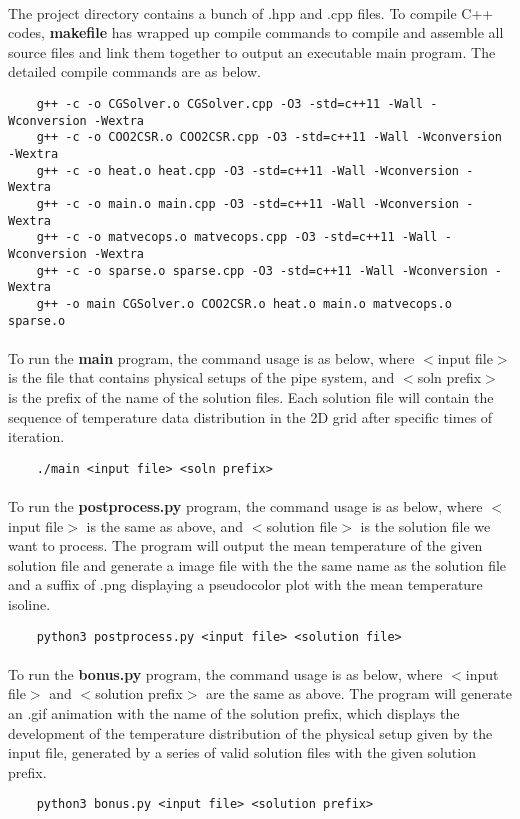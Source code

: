 \documentclass[12pt,letterpaper]{article}
\begin{document}
\paragraph{} The project directory contains a bunch of .hpp and .cpp files. To compile C++ codes, \textbf{makefile} has wrapped up compile commands to compile and assemble all source files and link them together to output an executable main program. The detailed compile commands are as below.
\begin{verbatim}
    g++ -c -o CGSolver.o CGSolver.cpp -O3 -std=c++11 -Wall -Wconversion -Wextra
    g++ -c -o COO2CSR.o COO2CSR.cpp -O3 -std=c++11 -Wall -Wconversion -Wextra
    g++ -c -o heat.o heat.cpp -O3 -std=c++11 -Wall -Wconversion -Wextra
    g++ -c -o main.o main.cpp -O3 -std=c++11 -Wall -Wconversion -Wextra
    g++ -c -o matvecops.o matvecops.cpp -O3 -std=c++11 -Wall -Wconversion -Wextra
    g++ -c -o sparse.o sparse.cpp -O3 -std=c++11 -Wall -Wconversion -Wextra
    g++ -o main CGSolver.o COO2CSR.o heat.o main.o matvecops.o sparse.o
\end{verbatim}
\paragraph{} To run the \textbf{main} program, the command usage is as below, where $<$input file$>$ is the file that contains physical setups of the pipe system, and $<$soln prefix$>$ is the prefix of the name of the solution files. Each solution file will contain the sequence of temperature data distribution in the 2D grid after specific times of iteration.
\begin{verbatim}
    ./main <input file> <soln prefix>
\end{verbatim}
\paragraph{} To run the \textbf{postprocess.py} program, the command usage is as below, where $<$input file$>$ is the same as above, and $<$solution file$>$ is the solution file we want to process. The program will output the mean temperature of the given solution file and generate a image file with the the same name as the solution file and a suffix of .png displaying a pseudocolor plot with the mean temperature isoline.
\begin{verbatim}
    python3 postprocess.py <input file> <solution file>
\end{verbatim}
\paragraph{} To run the \textbf{bonus.py} program, the command usage is as below, where $<$input file$>$ and $<$solution prefix$>$ are the same as above. The program will generate an .gif animation with the name of the solution prefix, which displays the development of the temperature distribution of the physical setup given by the input file, generated by a series of valid solution files with the given solution prefix.
\begin{verbatim}
    python3 bonus.py <input file> <solution prefix>
\end{verbatim}
\end{document}
